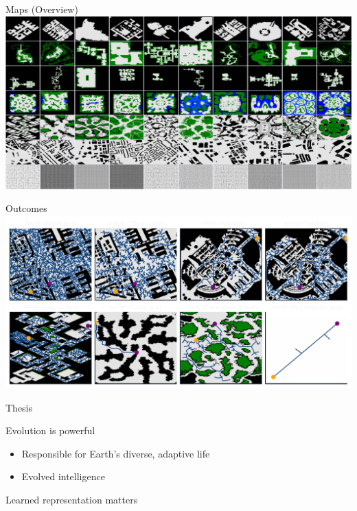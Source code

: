 \documentclass[aspectratio=169]{beamer}
\begin{document}
\begin{frame}{Maps (Overview)}
    \includegraphics[width=1.0\linewidth, keepaspectratio]{figures/show_maps_overview.pdf}
\end{frame}

\begin{frame}{Outcomes}
    \includegraphics[width=1.0\linewidth, keepaspectratio]{figures/learned.pdf}
\end{frame}


\begin{frame}[plain]{Thesis}
    \begin{vfilleditems}
      \item {\Huge Evolution is powerful}
        \begin{itemize}
          \item {\Medium Responsible for Earth's diverse, adaptive life}
          \item {\Medium \color{pureminimalistic@text@red} Evolved intelligence}
        \end{itemize}
      \item {\Huge Learned representation matters}
    \end{vfilleditems}
\end{frame}
\end{document}
